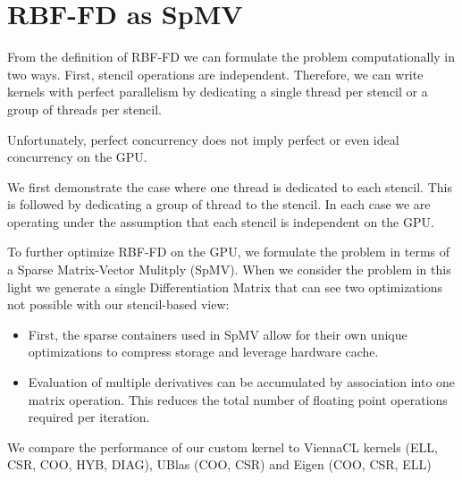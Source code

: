 \section{RBF-FD as SpMV}

From the definition of RBF-FD we can formulate the problem computationally in two ways. First, stencil operations are independent. Therefore, we can write kernels with perfect parallelism by dedicating a single thread per stencil or a group of threads per stencil.  

Unfortunately, perfect concurrency does not imply perfect or even ideal concurrency on the GPU. 

We first demonstrate the case where one thread is dedicated to each stencil. This is followed by dedicating a group of thread to the stencil. In each case we are operating under the assumption that each stencil is independent on the GPU. 

To further optimize RBF-FD on the GPU, we formulate the problem in terms of a Sparse Matrix-Vector Mulitply (SpMV). When we consider the problem in this light we generate a single Differentiation Matrix that can see two optimizations not possible with our stencil-based view: 
\begin{itemize} 
\item First, the sparse containers used in SpMV allow for their own unique optimizations to compress storage and leverage hardware cache.
\item Evaluation of multiple derivatives can be accumulated by association into one matrix operation. This reduces the total number of floating point operations required per iteration. 
\end{itemize}



We compare the performance of our custom kernel to ViennaCL kernels (ELL, CSR, COO, HYB, DIAG), UBlas (COO, CSR) and Eigen (COO, CSR, ELL)




